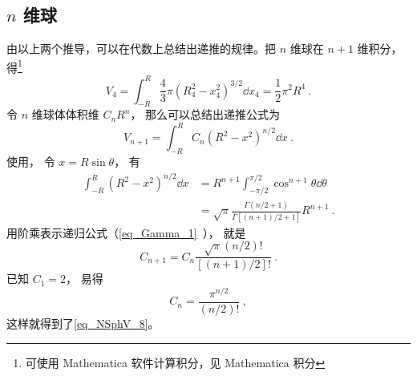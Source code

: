 \subsection{ $n$ 维球}
由以上两个推导，可以在代数上总结出递推的规律。把 $n$ 维球在 $n+1$ 维积分，得\footnote{可使用  Mathematica 软件计算积分，见 Mathematica 积分}%
\begin{equation}
V_4 = \int_{-R}^R \frac43 \pi (R_4^2 - x_4^2)^{3/2} \dd{x_4}  = \frac12 \pi^2 R^4~.
\end{equation}
令 $n$ 维球体体积维 $C_n R^n$， 那么可以总结出递推公式为
\begin{equation}
V_{n+1} = \int_{-R}^R C_n (R^2 - x^2)^{n/2}\dd{x}~.
\end{equation}
使用， 令 $x = R\sin\theta$， 有
\begin{equation}
\begin{aligned}
\int_{-R}^R (R^2 - x^2)^{n/2}\dd{x} &= R^{n+1} \int_{-\pi/2}^{\pi/2} \cos^{n+1}\theta \dd{\theta}\\
&= \sqrt{\pi} \frac{\Gamma(n/2+1)}{\Gamma[(n+1)/2+1]} R^{n+1}~.
\end{aligned}
\end{equation}
用阶乘表示递归公式（\autoref{eq_Gamma_1}~）， 就是
\begin{equation}
C_{n+1} = C_n \frac{\sqrt{\pi}(n/2)!}{[(n+1)/2]!}~.
\end{equation}
已知 $C_1 = 2$， 易得
\begin{equation}
C_n = \frac{\pi^{n/2}}{(n/2)!}~,
\end{equation}
这样就得到了\autoref{eq_NSphV_8}。
